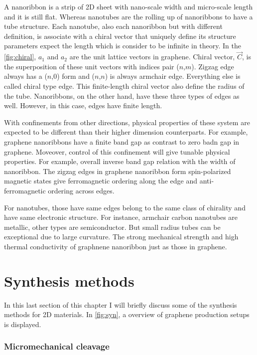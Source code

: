 A nanoribbon is a strip of 2D sheet with nano-scale width and micro-scale length and it is still flat. Whereas nanotubes are the rolling up of nanoribbons to have a tube structure. Each nanotube, also each nanoribbon but with different definition, is associate with a chiral vector that uniquely define its structure parameters expect the length which is consider to be infinite in theory. In the \autoref{fig:chiral}, $a_1$ and $a_2$ are the unit lattice vectors in graphene.  Chiral vector, $\vec{C}$, is the superposition of these unit vectors with indices pair ($n$,$m$). Zigzag edge always has a ($n$,0) form and ($n$,$n$) is always armchair edge. Everything else is called chiral type edge.  This finite-length chiral vector also define the radius of the tube. Nanoribbons, on the other hand, have these three types of edges as well. However, in this case, edges have finite length. 

With confinements from other directions, physical properties of these system are expected to be different than their higher dimension counterparts. For example, graphene nanoribbons have a finite band gap as contrast to zero badn gap in graphene\cite{Wang2008}. Moveover, control of this confinement will give tunable physical properties. For example, overall inverse band gap relation with the width of nanoribbon\cite{Han2007}. The zigzag edges in graphene nanoribbon form spin-polarized magnetic states give ferromagnetic ordering along the edge and anti-ferromagnetic ordering across edges\cite{Son2006}. 

For nanotubes, those have same edges belong to the same class of chirality and have same electronic structure. For instance, armchair carbon nanotubes are metallic, other types are semiconductor. But small radius tubes can be exceptional due to large curvature\cite{Bandaru2007}.  The strong mechanical strength and high thermal conductivity of graphnene nanoribbon just as those in graphene.




\section{Synthesis methods}

In this last section of this chapter I will briefly discuss some of the synthesis methods for 2D materials. In \autoref{fig:syn}, a overview of graphene production setups is displayed. 

\subsubsection{Micromechanical cleavage}


